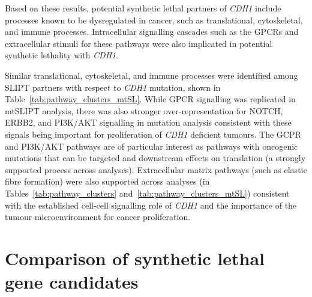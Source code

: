 Based on these results, potential synthetic lethal partners of \textit{CDH1} include processes known to be dysregulated in cancer, such as translational, cytoskeletal, and immune processes. Intracellular signalling cascades such as the GPCRs and extracellular stimuli for these pathways were also implicated in potential synthetic lethality with \textit{CDH1}.

Similar translational, cytoskeletal, and immune processes were identified among \gls{SLIPT} partners with respect to \textit{CDH1} mutation, shown in Table~\ref{tab:pathway_clusters_mtSL}. While GPCR signalling was replicated in mtSLIPT analysis, there was also stronger over-representation for NOTCH, ERBB2, and PI3K/AKT signalling in mutation analysis consistent with these signals being important for proliferation of \textit{CDH1} deficient tumours. The GCPR and PI3K/AKT pathways are of particular interest as pathways with oncogenic mutations that can be targeted and downstream effects on translation (a strongly supported process across analyses). Extracellular matrix pathways (such as elastic fibre formation) were also supported across analyses (in Tables~\ref{tab:pathway_clusters} and~\ref{tab:pathway_clusters_mtSL}) consistent with the established cell-cell signalling role of \textit{CDH1} and the importance of the tumour microenvironment for cancer proliferation.



\FloatBarrier

\section{Comparison of synthetic lethal gene candidates} \label{chapt3:compare_SL_genes}  



